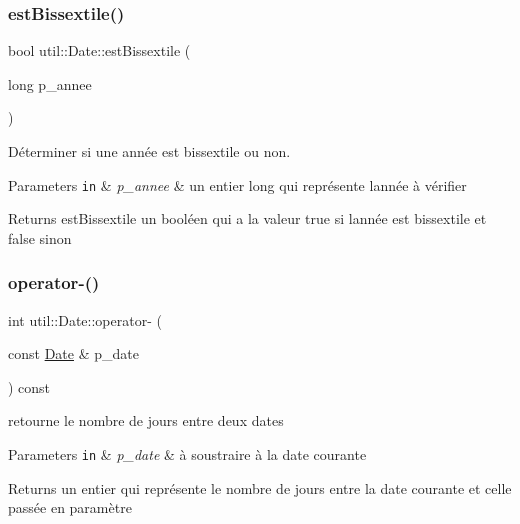 \subsubsection{\texorpdfstring{est\+Bissextile()}{estBissextile()}}
{\footnotesize\ttfamily bool util\+::\+Date\+::est\+Bissextile (\begin{DoxyParamCaption}\item[{long}]{p\+\_\+annee }\end{DoxyParamCaption})\hspace{0.3cm}{\ttfamily [static]}}



Déterminer si une année est bissextile ou non. 


\begin{DoxyParams}[1]{Parameters}
\mbox{\tt in}  & {\em p\+\_\+annee} & un entier long qui représente l\textquotesingle{}année à vérifier \\
\hline
\end{DoxyParams}
\begin{DoxyReturn}{Returns}
est\+Bissextile un booléen qui a la valeur true si l\textquotesingle{}année est bissextile et false sinon 
\end{DoxyReturn}
\mbox{\label{classutil_1_1Date_af12f2c545070b5e2b397be5379c5c3fd}} 
\subsubsection{\texorpdfstring{operator-\/()}{operator-()}}
{\footnotesize\ttfamily int util\+::\+Date\+::operator-\/ (\begin{DoxyParamCaption}\item[{const \hyperlink{classutil_1_1Date}{Date} \&}]{p\+\_\+date }\end{DoxyParamCaption}) const}



retourne le nombre de jours entre deux dates 


\begin{DoxyParams}[1]{Parameters}
\mbox{\tt in}  & {\em p\+\_\+date} & à soustraire à la date courante \\
\hline
\end{DoxyParams}
\begin{DoxyReturn}{Returns}
un entier qui représente le nombre de jours entre la date courante et celle passée en paramètre 
\end{DoxyReturn}
\mbox{\label{classutil_1_1Date_aefcf8a7520711f783fb0241d460480c5}} 
